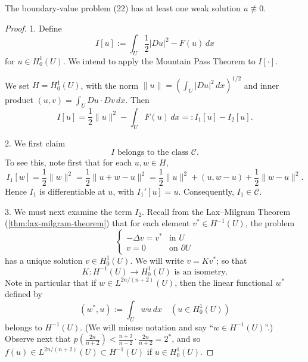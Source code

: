 \begin{theorem}
\label{thm:existence-nontrivial-solution-semilinear-elliptic}
The boundary-value problem (22) has at least one weak solution $u \not\equiv 0$.
\end{theorem}
\begin{proof}
1. Define
\[
I[u] := \int_U \frac{1}{2}|Du|^2 - F(u)\, dx
\tag{26}
\]
for $u \in H_0^1(U)$. We intend to apply the Mountain Pass Theorem to $I[\cdot]$.

We set $H = H_0^1(U)$, with the norm $\|u\| = \left(\int_U |Du|^2\, dx\right)^{1/2}$ and inner product $(u,v) = \int_U Du \cdot Dv\, dx$. Then
\[
I[u] = \frac{1}{2}\|u\|^2 - \int_U F(u)\, dx =: I_1[u] - I_2[u].
\]

2. We first claim
\[
I \text{ belongs to the class } \mathcal{C}.
\tag{27}
\]
To see this, note first that for each $u, w \in H$,
\[
I_1[w] = \frac{1}{2}\|w\|^2 = \frac{1}{2}\|u + w - u\|^2 = \frac{1}{2}\|u\|^2 + (u, w - u) + \frac{1}{2}\|w - u\|^2.
\]
Hence $I_1$ is differentiable at $u$, with $I_1'[u] = u$. Consequently, $I_1 \in \mathcal{C}$.

3. We must next examine the term $I_2$. Recall from the Lax--Milgram Theorem (\cref{thm:lax-milgram-theorem}) that for each element $v^* \in H^{-1}(U)$, the problem
\[
\begin{cases} -\Delta v = v^* & \text{in } U \\ v = 0 & \text{on } \partial U \end{cases}
\]
has a unique solution $v \in H_0^1(U)$. We will write $v = Kv^*$; so that
\[
K : H^{-1}(U) \to H_0^1(U) \text{ is an isometry.}
\tag{28}
\]
Note in particular that if $w \in L^{2n/(n+2)}(U)$, then the linear functional $w^*$ defined by
\[
(w^*, u) := \int_U wu\, dx \quad (u \in H_0^1(U))
\]
belongs to $H^{-1}(U)$. (We will misuse notation and say ``$w \in H^{-1}(U)$''.) Observe next that $p\left(\frac{2n}{n+2}\right) < \frac{n+2}{n-2} \cdot \frac{2n}{n+2} = 2^*$, and so $f(u) \in L^{2n/(n+2)}(U) \subset H^{-1}(U)$ if $u \in H_0^1(U)$.


\end{proof}
